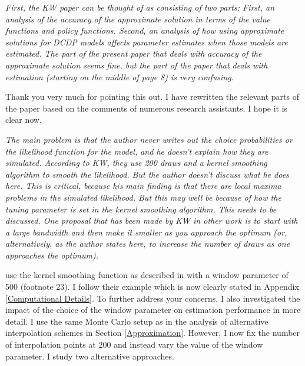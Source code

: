\begin{boenumerate}
\item \textit{First, the KW paper can be thought of as consisting of two parts: First, an analysis of the accuracy of the approximate solution in terms of the value functions and policy functions. Second, an analysis of how using approximate solutions for DCDP models affects parameter estimates when those models are estimated. The part of the present paper that deals with accuracy of the approximate solution seems fine, but the part of the paper that deals with estimation (starting on the middle of page 8) is very confusing.}\vspace{0.5cm}

Thank you very much for pointing this out. I have rewritten the relevant parts of the paper based on the comments of numerous research assistants. I hope it is clear now.
\item \textit{The main problem is that the author never writes out the choice probabilities or the likelihood function for the model, and he doesn't explain how they are simulated. According to KW, they use 200 draws and a kernel smoothing algorithm to smooth the likelihood. But the author doesn't discuss what he does here. This is critical, because his main finding is that there are local maxima problems in the simulated likelihood. But this may well be because of how the tuning parameter is set in the kernel smoothing algorithm. This needs to be discussed. One proposal that has been made by KW in other work is to start with a large bandwidth and then make it smaller as you approach the optimum (or, alternatively, as the author states here, to increase the number of draws as one approaches the optimum).}\vspace{0.5cm}

\cite{Keane.1994} use the kernel smoothing function as described in \citet{McFadden.1989} with a window parameter of 500 (footnote 23). I follow their example which is now clearly stated in Appendix \ref{Computational Details}. To further address your concerns, I also investigated the impact of the choice of the window parameter on estimation performance in more detail. I use the same Monte Carlo setup as in the analysis of alternative interpolation schemes in Section \ref{Approximation}. However, I now fix the number of interpolation points at 200 and instead vary the value of the window parameter. I study two alternative approaches.


\end{boenumerate}
